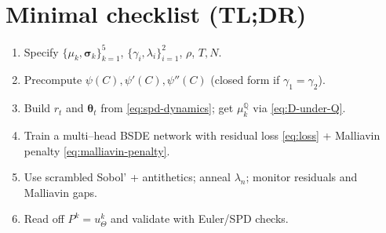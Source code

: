 \documentclass[11pt]{article}
\newcommand{\1}{\mathbbm{1}}
\newcommand{\bs}{\boldsymbol}
\begin{document}
\section{Minimal checklist (TL;DR)}
\begin{enumerate}[leftmargin=*, itemsep=0.35em]
  \item Specify \(\{\mu_k,\bs\sigma_k\}_{k=1}^5\), \(\{\gamma_i,\lambda_i\}_{i=1}^2\), \(\rho\), \(T,N\).
  \item Precompute \(\psi(C),\psi'(C),\psi''(C)\) (closed form if \(\gamma_1=\gamma_2\)).
  \item Build \(r_t\) and \(\bs\theta_t\) from \eqref{eq:spd-dynamics}; get \(\mu_k^{\mathbb{Q}}\) via \eqref{eq:D-under-Q}.
  \item Train a multi--head BSDE network with residual loss \eqref{eq:loss} + Malliavin penalty \eqref{eq:malliavin-penalty}.
  \item Use scrambled Sobol' + antithetics; anneal \(\lambda_n\); monitor residuals and Malliavin gaps.
  \item Read off \(P^k=u^k_\Theta\) and validate with Euler/SPD checks.
\end{enumerate}
\end{document}
